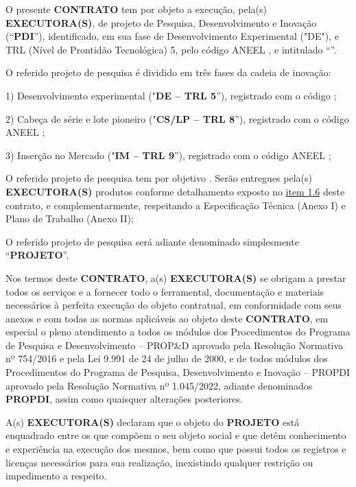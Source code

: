 
\xx O presente \textbf{\textbf{CONTRATO}} tem por objeto a execução, pela(s) \textbf{\textbf{EXECUTORA(S)}}, de projeto de Pesquisa, Desenvolvimento e Inovação (“\textbf{PDI}”), identificado, em sua fase de Desenvolvimento Experimental ("DE"), e TRL (Nível de Prontidão Tecnológica) 5, pelo código ANEEL \textbf{\CodAneelProjeto}, e intitulado “\TituloCompletoProjeto”.

\xxx O referido projeto de pesquisa é dividido em três fases da cadeia de inovação:

1) Desenvolvimento experimental ("\textbf{DE – TRL 5}”), registrado com o código \textbf{\CodAneelProjeto};

2) Cabeça de série e lote pioneiro ("\textbf{CS/LP – TRL 8}”), registrado com o código ANEEL \textbf{\CodAneelProjeto};

3) Inserção no Mercado ("\textbf{IM – TRL 9}”), registrado com o código ANEEL \textbf{\CodAneelProjeto};

\xxx O referido projeto de pesquisa tem por objetivo \ObjetivoDoProjeto. Serão entregues pela(s) \textbf{\textbf{EXECUTORA(S)}} produtos conforme detalhamento exposto no \hyperlink{1.6}{item 1.6} deste contrato, e complementarmente, respeitando a Especificação Técnica (Anexo I) e Plano de Trabalho (Anexo II);

\xxx O referido projeto de pesquisa será adiante denominado simplesmente “\textbf{\textbf{PROJETO}}”.

\xx Nos termos deste \textbf{CONTRATO}, a(s) \textbf{EXECUTORA(S)} se obrigam a prestar todos os serviços e a fornecer todo o ferramental, documentação e materiais necessários à perfeita execução do objeto contratual, em conformidade com seus anexos e com todas as normas aplicáveis ao objeto deste \textbf{CONTRATO}, em especial o pleno atendimento a todos os módulos dos Procedimentos do Programa de Pesquisa e Desenvolvimento – PROP\&D aprovado pela Resolução Normativa nº 754/2016 e pela Lei 9.991 de 24 de julho de 2000, e de todos módulos dos Procedimentos do Programa de Pesquisa, Desenvolvimento e Inovação – PROPDI aprovado pela Resolução Normativa nº 1.045/2022, adiante denominados \textbf{PROPDI}, assim como quaisquer alterações posteriores.

\xx A(s) \textbf{EXECUTORA(S)} declaram que o objeto do \textbf{PROJETO} está enquadrado entre os que compõem o seu objeto social e que detêm conhecimento e experiência na execução dos mesmos, bem como que possui todos os registros e licenças necessários para sua realização, inexistindo qualquer restrição ou impedimento a respeito.

